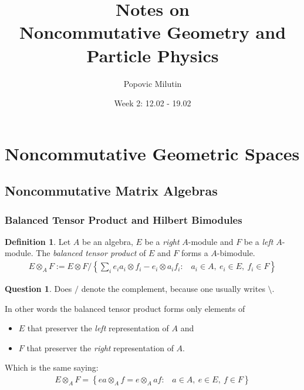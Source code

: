 \documentclass[a4paper]{article}
\title{Notes on \\ Noncommutative Geometry and Particle Physics}
\author{Popovic Milutin}
\date{Week 2: 12.02 - 19.02}
\theoremstyle{definition}
\newtheorem{definition}{Definition}
\theoremstyle{definition}
\newtheorem{question}{Question}
\theoremstyle{definition}
\theoremstyle{theorem}
\theoremstyle{theorem}
\theoremstyle{theorem}
\theoremstyle{definition}
\begin{document}
\maketitle
\tableofcontents

\section{Noncommutative Geometric Spaces}
\subsection{Noncommutative Matrix Algebras}
\subsubsection{Balanced Tensor Product and Hilbert Bimodules}

\begin{definition}
    Let $A$ be an algebra, $E$ be a \textit{right} $A$-module and $F$ be a \textit{left} $A$-module.
    The \textit{balanced tensor product} of $E$ and $F$ forms a $A$-bimodule.
    \begin{align*}
        E \otimes _A F := E \otimes F / \left\{\sum _i e_i a_i \otimes f_i - e_i \otimes a_i f_i : \;\;\;
                                         a_i \in A,\ e_i \in E,\ f_i \in F \right\}
    \end{align*}
\end{definition}
\begin{question}
    Does $/$ denote the complement, because one usually writes $\setminus$.
\end{question}
In other words the balanced tensor product forms only elements of
\begin{itemize}
    \item $E$ that preserver the \textit{left} representation of $A$ and
    \item $F$ that preserver the \textit{right} representation of $A$.
\end{itemize}
Which is the same saying:
\begin{align*}
    E \otimes _A F = \left\{e a\otimes _A f = e \otimes _A a f: \;\;\; a \in A,\ e \in E,\ f \in F \right\}
\end{align*}
\end{document}
